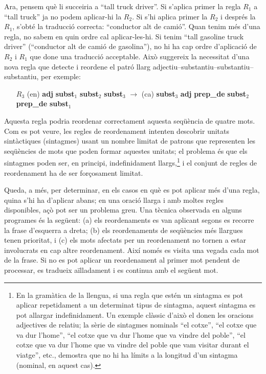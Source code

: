 Ara, pensem què li succeiria a ``tall truck driver''. Si s'aplica
primer la regla $R_1$ a ``tall truck'' ja no podem aplicar-hi la
$R_2$. Si s'hi aplica primer la $R_2$ i després la $R_1$, s'obté la
traducció correcta: ``conductor alt de camió''. Quan tenim més d'una
regla, no sabem en quin ordre cal aplicar-les-hi. Si tenim ``tall
gasoline truck driver'' (``conductor alt de camió de gasolina''), no
hi ha cap ordre d'aplicació de $R_2$ i $R_1$ que done una traducció
acceptable.  Això suggereix la necessitat d'una nova regla que detecte
i reordene el patró llarg
adjectiu--substantiu--substantiu--substantiu, per exemple:
\begin{itemize}
\item[$R_3$] (en) \textbf{adj} \textbf{subst}$_1$ \textbf{subst}$_2$ \textbf{subst}$_3$
$\rightarrow$ (ca) \textbf{subst}$_3$ \textbf{adj} \textbf{prep\_de} \textbf{subst}$_2$ \textbf{prep\_de} \textbf{subst}$_1$
\end{itemize}  
Aquesta regla podria reordenar correctament aquesta seqüència de
quatre mots. Com es pot veure, les regles de reordenament intenten
descobrir unitats sintàctiques (sintagmes) usant un nombre limitat de
patrons que representen les seqüències de mots que poden formar
aquestes unitats; el problema és que els sintagmes poden ser, en
principi, indefinidament llargs,\footnote{En la gramàtica de la
  llengua, si una regla que estén un sintagma es pot aplicar
  repetidament a un determinat tipus de sintagma, aquest sintagma es
  pot allargar indefinidament. Un exemple clàssic d'això el donen les
  oracions adjectives de relatiu; la sèrie de sintagmes nominals ``el
  cotxe'', ``el cotxe que va dur l'home'', ``el cotxe que va dur
  l'home que va vindre del poble'', ``el cotxe que va dur l'home que
  va vindre del poble que vam visitar durant el viatge'', etc.,
  demostra que no hi ha límits a la longitud d'un sintagma (nominal,
  en aquest cas).} i el conjunt de regles de reordenament ha de ser
forçosament limitat.

Queda, a més, per determinar, en els casos en què es pot aplicar més
d'una regla, quina s'hi ha d'aplicar abans; en una oració llarga i amb
moltes regles disponibles, açò pot ser un problema greu. Una tècnica
observada en alguns programes és la següent: (a) els reordenaments es
van aplicant segons es recorre la frase d'esquerra a dreta; (b) els
reordenaments de seqüències més llargues tenen prioritat, i (c) els
mots afectats per un reordenament no tornen a estar involucrats en cap
altre reordenament. Així només es visita una vegada cada mot de la
frase. Si no es pot aplicar un reordenament al primer mot pendent de
processar, es tradueix aïlladament i es continua amb el següent mot.

